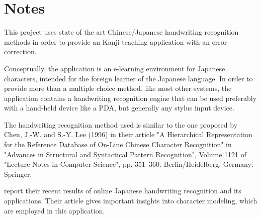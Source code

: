 \chapter{Notes}

This project uses state of the art Chinese/Japanese handwriting recognition methods in order to provide an Kanji teaching application with an error correction.

Conceptually, the application is an e-learning environment for Japanese characters, intended for the foreign learner of the Japanese language. In order to provide more than a  multiple choice method, like most other systems, the application contains a handwriting recognition engine that can be used preferably with a hand-held device like a PDA, but generally any stylus input device.

The handwriting recognition method used is similar to the one proposed by Chen, J.-W. and S.-Y. Lee (1996) in their article "A Hierarchical Representation for the Reference Database of On-Line Chinese Character Recognition" in "Advances in Structural and Syntactical Pattern Recognition", Volume
1121 of "Lecture Notes in Computer Science", pp. 351--360. Berlin/Heidelberg, Germany: Springer.

\cite{Nakagawa2008} report their recent results of online Japanese handwriting recognition
and its applications. Their article gives important insights into character modeling, which are employed in this application.


